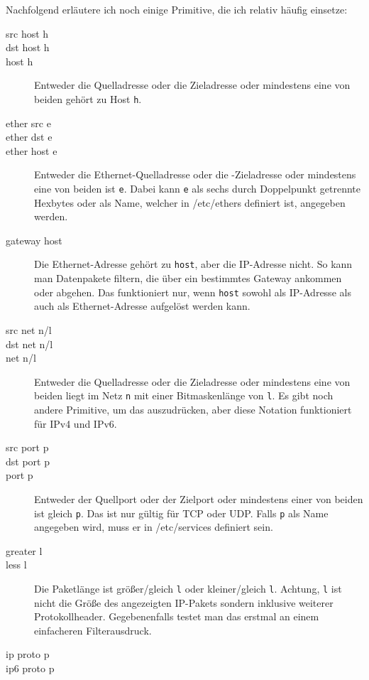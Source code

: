 \begin{normaltext}
  Nachfolgend erläutere ich noch einige Primitive, die ich relativ häufig
  einsetze:
  \begin{description}
    \item[src host h]
    \item[dst host h]
    \item[host h] Entweder die Quelladresse oder die Zieladresse oder
      mindestens eine von beiden gehört zu Host \verb?h?.
    \item[ether src e]
    \item[ether dst e]
    \item[ether host e] Entweder die Ethernet-Quelladresse oder die
      -Zieladresse oder mindestens eine von beiden ist \verb?e?. Dabei kann
      \verb?e? als sechs durch Doppelpunkt getrennte Hexbytes oder als Name,
      welcher in /etc/ethers definiert ist, angegeben werden.
    \item[gateway host] Die Ethernet-Adresse gehört zu \verb?host?, aber die
      IP-Adresse nicht. So kann man Datenpakete filtern, die über ein
      bestimmtes Gateway ankommen oder abgehen. Das funktioniert nur, wenn
      \verb?host? sowohl als IP-Adresse als auch als Ethernet-Adresse
      aufgelöst werden kann.
    \item[src net n/l]
    \item[dst net n/l]
    \item[net n/l] Entweder die Quelladresse oder die Zieladresse oder
      mindestens eine von beiden liegt im Netz \verb?n? mit einer
      Bitmaskenlänge von \verb?l?. Es gibt noch andere Primitive, um das
      auszudrücken, aber diese Notation funktioniert für IPv4 und IPv6.
    \item[src port p]
    \item[dst port p]
    \item[port p] Entweder der Quellport oder der Zielport oder mindestens
      einer von beiden ist gleich \verb?p?. Das ist nur gültig für TCP oder
      UDP. Falls \verb?p? als Name angegeben wird, muss er in /etc/services
      definiert sein.
    \item[greater l]
    \item[less l]
      Die Paketlänge ist größer/gleich \verb?l? oder kleiner/gleich \verb?l?.
      Achtung, \verb?l? ist nicht die Größe des angezeigten IP-Pakets sondern
      inklusive weiterer Protokollheader. Gegebenenfalls testet man das
      erstmal an einem einfacheren Filterausdruck.
    \item[ip proto p]
    \item[ip6 proto p]

\end{description}
\end{normaltext}
